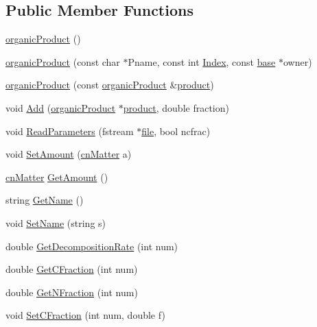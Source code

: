 \subsection*{Public Member Functions}
\begin{DoxyCompactItemize}
\item 
\hyperlink{classorganic_product_a9442aaacbeb8c6ece232b009e8849f11}{organicProduct} ()
\item 
\hyperlink{classorganic_product_a7f742dabf4d9dcfa12a14510a4d9e315}{organicProduct} (const char $\ast$Pname, const int \hyperlink{classbase_afa59aaa1a0201700640234eb13a03aae}{Index}, const \hyperlink{classbase}{base} $\ast$owner)
\item 
\hyperlink{classorganic_product_aefc7ff5ac707cd2d3f06b8a68267c6f1}{organicProduct} (const \hyperlink{classorganic_product}{organicProduct} \&\hyperlink{classproduct}{product})
\item 
void \hyperlink{classorganic_product_ab8e426e0ccc28b8e577d336f237bc956}{Add} (\hyperlink{classorganic_product}{organicProduct} $\ast$\hyperlink{classproduct}{product}, double fraction)
\item 
void \hyperlink{classorganic_product_acea84ea54c011ee842e7a90ae3fabcec}{ReadParameters} (fstream $\ast$\hyperlink{classbase_a3af52ee9891719d09b8b19b42450b6f6}{file}, bool ncfrac)
\item 
void \hyperlink{classorganic_product_a37de4c556fd969898cdf6af1375a7542}{SetAmount} (\hyperlink{classcn_matter}{cnMatter} a)
\item 
\hyperlink{classcn_matter}{cnMatter} \hyperlink{classorganic_product_acf7568317f8ce00b6073eda432ba7483}{GetAmount} ()
\item 
string \hyperlink{classorganic_product_a1ff3dd7c96d3d9fd7dee39aafc9cc0a5}{GetName} ()
\item 
void \hyperlink{classorganic_product_add731f4e9ff946d3c662545ce7b86785}{SetName} (string s)
\item 
double \hyperlink{classorganic_product_ae45c737a922deb7c54c890d503d2ed26}{GetDecompositionRate} (int num)
\item 
double \hyperlink{classorganic_product_a8017dbe0d08fdbc603c7e66c1aad6bb7}{GetCFraction} (int num)
\item 
double \hyperlink{classorganic_product_ab67cb65794b92f1f4181efdb988b0524}{GetNFraction} (int num)
\item 
void \hyperlink{classorganic_product_ae6f2c4cfc006067ed21baa50e8e3c4db}{SetCFraction} (int num, double f)
\item 

\end{DoxyCompactItemize}
